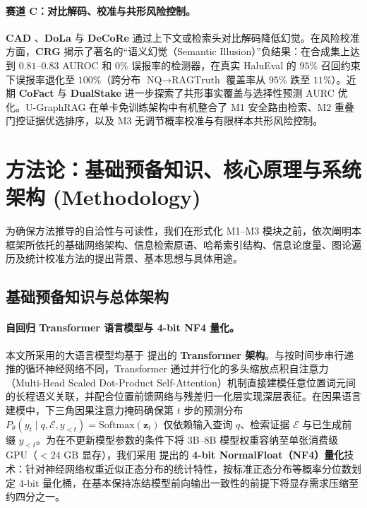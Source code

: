 \documentclass[11pt]{article}
\begin{document}
\paragraph{赛道 C：对比解码、校准与共形风险控制。}
\textbf{CAD} \cite{shi2024cad}、\textbf{DoLa} \cite{chuang2024dola} 与 \textbf{DeCoRe} \cite{gema2025decore} 通过上下文或检索头对比解码降低幻觉。在风险校准方面，\textbf{CRG} \cite{sinha2025crg} 揭示了著名的“语义幻觉（Semantic Illusion）”负结果：在合成集上达到 $0.81\text{--}0.83$ AUROC 和 $0\%$ 误报率的检测器，在真实 HaluEval 的 $95\%$ 召回约束下误报率退化至 $100\%$（跨分布 $\text{NQ}\to\text{RAGTruth}$ 覆盖率从 $95\%$ 跌至 $11\%$）。近期 \textbf{CoFact} \cite{cofact2026} 与 \textbf{DualStake} \cite{dualstake2026} 进一步探索了共形事实覆盖与选择性预测 AURC 优化。U-GraphRAG 在单卡免训练架构中有机整合了 M1 安全路由检索、M2 重叠门控证据优选排序，以及 M3 无调节概率校准与有限样本共形风险控制。

\section{方法论：基础预备知识、核心原理与系统架构 (Methodology)}

为确保方法推导的自洽性与可读性，我们在形式化 M1--M3 模块之前，依次阐明本框架所依托的基础网络架构、信息检索原语、哈希索引结构、信息论度量、图论遍历及统计校准方法的提出背景、基本思想与具体用途。

\subsection{基础预备知识与总体架构}
\label{sec:zh_prelim}

\paragraph{自回归 Transformer 语言模型与 4-bit NF4 量化。}
本文所采用的大语言模型均基于 \citet{vaswani2017attention} 提出的 \textbf{Transformer 架构}。与按时间步串行递推的循环神经网络不同，Transformer 通过并行化的多头缩放点积自注意力（Multi-Head Scaled Dot-Product Self-Attention）机制直接建模任意位置词元间的长程语义关联，并配合位置前馈网络与残差归一化层实现深层表征。在因果语言建模中，下三角因果注意力掩码确保第 $t$ 步的预测分布 $P_{\theta}(y_t \mid q, \mathcal{E}, y_{<t}) = \mathrm{Softmax}(\mathbf{z}_t)$ 仅依赖输入查询 $q$、检索证据 $\mathcal{E}$ 与已生成前缀 $y_{<t}$。为在不更新模型参数的条件下将 3B--8B 模型权重容纳至单张消费级 GPU（$<24\text{ GB}$ 显存），我们采用 \citet{dettmers2023qlora} 提出的 \textbf{4-bit NormalFloat（NF4）量化}技术：针对神经网络权重近似正态分布的统计特性，按标准正态分布等概率分位数划定 4-bit 量化桶，在基本保持冻结模型前向输出一致性的前提下将显存需求压缩至约四分之一。
\end{document}
